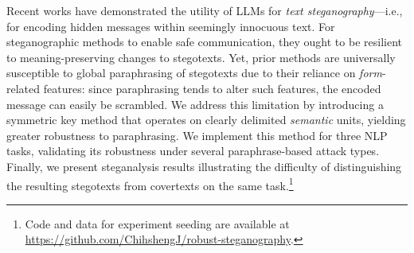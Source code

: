 Recent works have demonstrated the utility of LLMs for \emph{text steganography}---i.e., for encoding hidden messages within seemingly innocuous text. For steganographic methods to enable safe communication, they ought to be resilient to meaning-preserving changes to stegotexts. Yet, prior methods are universally susceptible to global paraphrasing of stegotexts due to their reliance on \emph{form}-related features: since paraphrasing tends to alter such features, the encoded message can easily be scrambled. We address this limitation by introducing a symmetric key method that operates on clearly delimited \emph{semantic} units, yielding greater robustness to paraphrasing. We implement this method for three NLP tasks, validating its robustness under several paraphrase-based attack types. Finally, we present steganalysis results illustrating the difficulty of distinguishing the resulting stegotexts from covertexts on the same task.\footnote{Code and data for experiment seeding are available at \url{https://github.com/ChihshengJ/robust-steganography}.}

